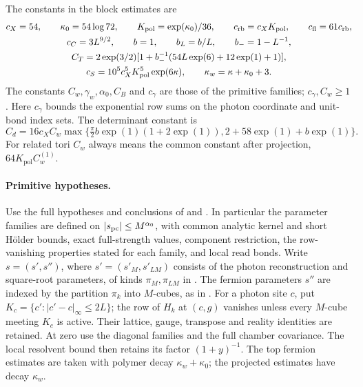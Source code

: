 The constants in the block estimates are
\[
 \begin{gathered}
 c_X=54,\qquad \kappa_0=54\log72,\qquad K_{\mathrm{pol}}=\exp(\kappa_0)/36,\qquad
 c_{\rm rb}=c_XK_{\mathrm{pol}},\qquad c_{\rm fl}=61c_{\rm rb},\\
 c_C=3L^{9/2},\qquad b=1,\qquad b_L=b/L,\qquad b_-=1-L^{-1},\\
 C_T=2\exp(3/2)
       [1+b_-^{-1}(54L\exp(6)+12\exp(1)+1)],\\
 c_S=10^5c_X^5K_{\mathrm{pol}}^5\exp(6\kappa),\qquad
 \kappa_w=\kappa+\kappa_0+3.
 \end{gathered}
\]
The constants \(C_w,\gamma_w,\alpha_0,C_B\) and \(c_\gamma\) are those
of the primitive families; \(c_\gamma,C_w\ge1\).
Here \(c_\gamma\) bounds the exponential row sums on the photon
coordinate and unit-bond index sets. The determinant constant is
\[
 C_d=16c_XC_w\max\{\tfrac\pi2 b\exp(1)(1+2\exp(1)),
                         2+58\exp(1)+b\exp(1)\}.
\]
For related tori \(C_w\) always means the common constant after
projection, \(64K_{\mathrm{pol}}C_w^{(1)}\).

\paragraph{Primitive hypotheses.}
Use the full hypotheses and conclusions of
\cite[Theorems A--B and Proposition 5.1]{MaxwellBlockManuscript}
and \cite[Theorem A and Propositions 4.1--4.3]{FermionBlockManuscript}.
In particular the parameter families are defined on
\(|s_{\rm pc}|\le M^{\alpha_0}\), with common analytic kernel and
short H\"older bounds, exact full-strength values, component
restriction, the row-vanishing properties stated for each family,
and local read bonds.
Write $s=(s',s'')$, where $s'=(s'_M,s'_{LM})$ consists of
the photon reconstruction and square-root parameters, of kinds
$\pi_M,\pi_{LM}$ in \cite[(37)]{MaxwellBlockManuscript}.
The fermion parameters $s''$ are indexed by the partition
$\pi_k$ into $M$-cubes, as in
\cite[\S4.1]{FermionBlockManuscript}.
For a photon site $c$, put
$K_c=\{c':|c'-c|_\infty\le2L\}$; the row of $H_k$ at $(c,g)$
vanishes unless every $M$-cube meeting $K_c$ is active.
Their lattice, gauge, transpose and reality identities are retained.
At zero use the diagonal families and the full chamber covariance.
The local resolvent bound then retains its factor \((1+y)^{-1}\).
The top fermion estimates are taken with polymer decay
\(\kappa_w+\kappa_0\); the projected estimates have decay \(\kappa_w\).

